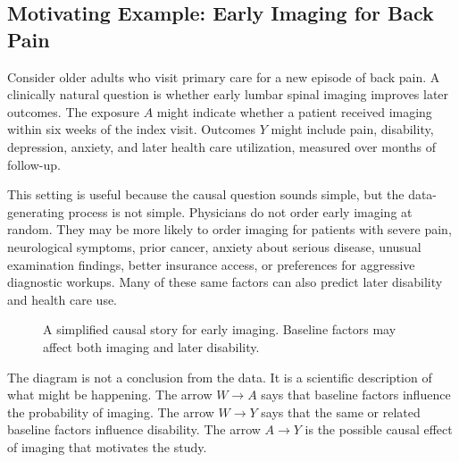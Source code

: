 \label{lec:2-1}

\subsection{Motivating Example: Early Imaging for Back Pain}

Consider older adults who visit primary care for a new episode of back pain. A clinically natural question is whether early lumbar spinal imaging improves later outcomes. The exposure $A$ might indicate whether a patient received imaging within six weeks of the index visit. Outcomes $Y$ might include pain, disability, depression, anxiety, and later health care utilization, measured over months of follow-up.

This setting is useful because the causal question sounds simple, but the data-generating process is not simple. Physicians do not order early imaging at random. They may be more likely to order imaging for patients with severe pain, neurological symptoms, prior cancer, anxiety about serious disease, unusual examination findings, better insurance access, or preferences for aggressive diagnostic workups. Many of these same factors can also predict later disability and health care use.

\begin{figure}[H]
\centering
{}
\caption{A simplified causal story for early imaging. Baseline factors may affect both imaging and later disability.}
\end{figure}

The diagram is not a conclusion from the data. It is a scientific description of what might be happening. The arrow $W\to A$ says that baseline factors influence the probability of imaging. The arrow $W\to Y$ says that the same or related baseline factors influence disability. The arrow $A\to Y$ is the possible causal effect of imaging that motivates the study.

